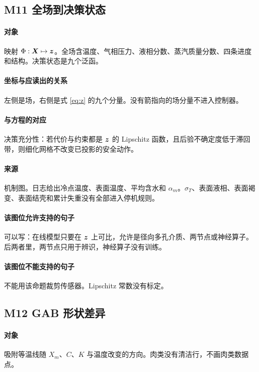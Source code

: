 \subsection{M11 全场到决策状态}
\paragraph{对象}
映射 $\Phi:\bm{X}\mapsto\bm{z}$。全场含温度、气相压力、液相分数、蒸汽质量分数、四条进度和结构。决策状态是九个泛函。

\paragraph{坐标与应读出的关系}
左侧是场，右侧是式 \eqref{eq:z} 的九个分量。没有箭指向的场分量不进入控制器。

\paragraph{与方程的对应}
决策充分性：若代价与约束都是 $\bm{z}$ 的 Lipschitz 函数，且后验不确定度低于滞回带，则细化网格不改变已投影的安全动作。

\paragraph{来源}
机制图。日志给出冷点温度、表面温度、平均含水和 $\alpha_m$。$\sigma_T$、表面液相、表面褐变、表面结壳和累计失重没有全部进入停机规则。

\paragraph{该图位允许支持的句子}
可以写：在线模型只要在 $\bm{z}$ 上可比，允许是径向多孔介质、两节点或神经算子。后两者里，两节点只用于辨识，神经算子没有训练。

\paragraph{该图位不能支持的句子}
不能用该命题裁剪传感器。Lipschitz 常数没有标定。

\subsection{M12 GAB 形状差异}
\paragraph{对象}
吸附等温线随 $X_m$、$C$、$K$ 与温度改变的方向。肉类没有清洁行，不画肉类数据点。


